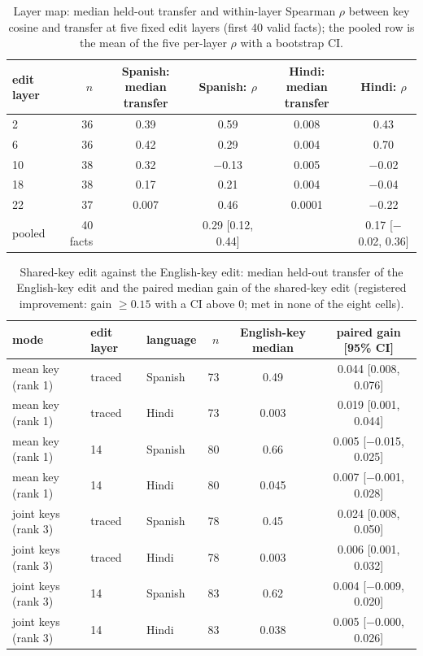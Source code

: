 \documentclass[11pt]{article}
\begin{document}
\begin{table}[t]\centering\small\begin{tabular}{lrcccc}\toprule
edit layer & $n$ & Spanish: median transfer & Spanish: $\rho$ & Hindi: median transfer & Hindi: $\rho$ \\\midrule
2 & 36 & 0.39 & 0.59 & 0.008 & 0.43 \\
6 & 36 & 0.42 & 0.29 & 0.004 & 0.70 \\
10 & 38 & 0.32 & $-$0.13 & 0.005 & $-$0.02 \\
18 & 38 & 0.17 & 0.21 & 0.004 & $-$0.04 \\
22 & 37 & 0.007 & 0.46 & 0.0001 & $-$0.22 \\
\addlinespace pooled & 40 facts & & 0.29 [0.12, 0.44] & & 0.17 [$-$0.02, 0.36] \\
\bottomrule\end{tabular}\caption{Layer map: median held-out transfer and within-layer Spearman $\rho$ between key cosine and transfer at five fixed edit layers (first 40 valid facts); the pooled row is the mean of the five per-layer $\rho$ with a bootstrap CI.}\label{tab:layers}\end{table}
\begin{table}[t]\centering\small\begin{tabular}{lllrcc}\toprule
mode & edit layer & language & $n$ & English-key median & paired gain [95\% CI] \\\midrule
mean key (rank 1) & traced & Spanish & 73 & 0.49 & 0.044 [0.008, 0.076] \\
mean key (rank 1) & traced & Hindi & 73 & 0.003 & 0.019 [0.001, 0.044] \\
mean key (rank 1) & 14 & Spanish & 80 & 0.66 & 0.005 [$-$0.015, 0.025] \\
mean key (rank 1) & 14 & Hindi & 80 & 0.045 & 0.007 [$-$0.001, 0.028] \\
\addlinespace
joint keys (rank 3) & traced & Spanish & 78 & 0.45 & 0.024 [0.008, 0.050] \\
joint keys (rank 3) & traced & Hindi & 78 & 0.003 & 0.006 [0.001, 0.032] \\
joint keys (rank 3) & 14 & Spanish & 83 & 0.62 & 0.004 [$-$0.009, 0.020] \\
joint keys (rank 3) & 14 & Hindi & 83 & 0.038 & 0.005 [$-$0.000, 0.026] \\
\bottomrule\end{tabular}\caption{Shared-key edit against the English-key edit: median held-out transfer of the English-key edit and the paired median gain of the shared-key edit (registered improvement: gain $\geq 0.15$ with a CI above 0; met in none of the eight cells).}\label{tab:shared}\end{table}
\end{document}
